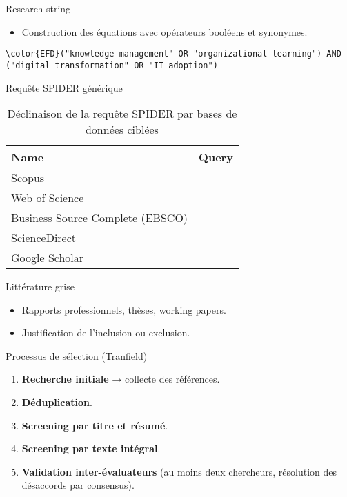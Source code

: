 \documentclass[a4paper,12pt]{article}
\begin{document}
Research string
\begin{itemize}
\item Construction des équations avec opérateurs booléens et synonymes.
\end{itemize}

\begin{listing}[htbp]
\begin{Code}
\begin{Verbatim}
\color{EFD}("knowledge management" OR "organizational learning") AND ("digital transformation" OR "IT adoption")
\end{Verbatim}
\end{Code}
\caption{Requête SPIDER générique}
\end{listing}

\begin{table}[htbp]
\caption{Déclinaison de la requête SPIDER par bases de données ciblées}
\centering
\begin{tabular}{ll}
Name & Query\\
\hline
Scopus & \\
Web of Science & \\
Business Source Complete (EBSCO) & \\
ScienceDirect & \\
Google Scholar & \\
\end{tabular}
\end{table}

Littérature grise
\begin{itemize}
\item Rapports professionnels, thèses, working papers.
\item Justification de l’inclusion ou exclusion.
\end{itemize}

Processus de sélection (Tranfield)
\begin{enumerate}
\item \textbf{\textbf{Recherche initiale}} → collecte des références.
\item \textbf{\textbf{Déduplication}}.
\item \textbf{\textbf{Screening par titre et résumé}}.
\item \textbf{\textbf{Screening par texte intégral}}.
\item \textbf{\textbf{Validation inter-évaluateurs}} (au moins deux chercheurs, résolution des désaccords par consensus).
\end{enumerate}
\end{document}
